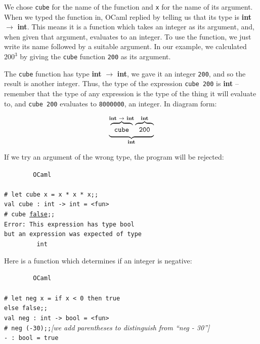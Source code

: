 \documentclass[]{book}
\newcommand{\smspace}{\vspace{4mm}}
\begin{document}
\noindent We chose \texttt{cube} for the name of the function and \texttt{x} for the name of its argument. When we typed the function in, OCaml replied by telling us that its type is \index{$\rightarrow$}\textrm{\textbf{int} $\rightarrow$ \textbf{int}}. This means it is a function which takes an integer as its argument, and, when given that argument, evaluates to an integer. To use the function, we just write its name followed by a suitable argument. In our example, we calculated $200^3$ by giving the \texttt{cube} function \texttt{200} as its argument.

The \texttt{cube} function has type \textrm{\textbf{int} $\rightarrow$ \textbf{int}}, we gave it an integer \texttt{200}, and so the result is another integer. Thus, the type of the expression \texttt{cube 200} is \textbf{\textrm{int}} -- remember that the type of any expression is the type of the thing it will evaluate to, and \texttt{cube 200} evaluates to \texttt{8000000}, an integer. In diagram form:

\smspace
$$\underbrace{\overbrace{\texttt{\strut  \ cube   }}^{\textbf{\textrm{int $\rightarrow$ int}}} \overbrace{\texttt{\strut \  200   }}^{\textbf{\textrm{int}}}}_{\textrm{\textbf{int}}}$$
\smspace

\noindent If we try an argument of the wrong type, the program will be rejected:

\smspace
\noindent\verb!        OCaml!\\
\noindent\\
\noindent\verb!# let cube x = x * x * x;;!\\
\noindent\verb!val cube : int -> int = <fun>!\\
\noindent\texttt{\# cube \underline{\vphantom{i}false};;}\\
\noindent\verb!Error: This expression has type bool!\\
\noindent\verb!but an expression was expected of type!\\
\noindent\verb!         int!
\smspace

\noindent Here is a function which determines if an integer is negative:

{\small
\smspace
\noindent\verb!        OCaml!\\
\noindent\\
\noindent\verb!# let neg x = if x < 0 then true!\\
\noindent\verb!else false;;!\\
\noindent\verb!val neg : int -> bool = <fun>!\\
\noindent\texttt{\# neg (-30);;}\hfill\textit{[we add parentheses to distinguish from ``neg - 30'']}\\
\noindent\verb!- : bool = true!
\smspace
}
\end{document}
